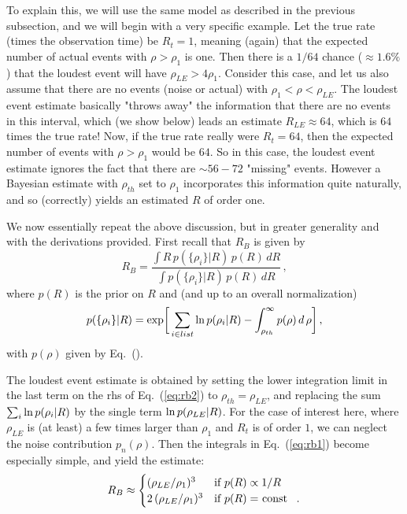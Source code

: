 \documentclass[aps,prd]{revtex4-1}
\newcommand{\be}{\begin{equation}}
\newcommand{\ee}{\end{equation}}
\begin{document}
To explain this, we will use the same model as described in the previous subsection, and we will begin with a very specific example.   Let the true rate (times the observation time) be $R_t = 1$, meaning (again) that the expected number of actual events with $\rho > \rho_1$ is one.   Then there is a $1/64$ chance ($\approx 1.6\%$) that the loudest event will have $\rho_{LE} > 4 \rho_1$.  Consider this case, and let us also assume that there are no events (noise or actual) with $\rho_1 < \rho < \rho_{LE}$.  The loudest event estimate basically "throws away" the information that there
are no events in this interval, which (we show below) leads an estimate $R_{LE} \approx 64$,
  which is $64$ times the true rate!  Now, if the true rate really were $R_t = 64$, then the expected number of 
events with $\rho > \rho_1$ would be $64$.  So in this case, the loudest event estimate 
ignores the fact that there are $\sim 56 -72$ "missing" events.  However a Bayesian estimate
with $\rho_{th}$ set to $\rho_1$ incorporates this information quite naturally, and so (correctly) yields an estimated $R$ of order one.

We now essentially repeat the above discussion, but in greater generality and with the derivations provided.   First recall that $R_B$ is given by
\be\label{eq:rb1}
R_B = \frac{  \int{ R\, p(\{\rho_i\}|R)  \, p(R)\, dR}}{  \int{ p(\{\rho_i\}|R)\, p(R)\, dR }}\, ,
\ee
\noindent
where $p(R)$ is the prior on $R$ and (and up to an overall normalization)
\be\label{eq:rb2}
p(\{\rho_i\}|R) = {\rm exp}\bigg[\sum_{i \in  list} {\rm ln}\, p(\rho_i|R) - \int_{\rho_{th}}^{\infty} p(\rho)\, d\,\rho  \bigg] \,  ,
\ee
\noindent
with $p(\rho)$ given by Eq.~().

The loudest event estimate is obtained by setting the lower integration limit in the last term on the rhs of Eq.~(\ref{eq:rb2}) to $\rho_{th} = \rho_{LE}$, and replacing the sum 
$\sum_i {\rm ln}\, p(\rho_i|R)$ by the single term ${\rm ln}\, p(\rho_{LE}|R)$.   For the case of interest here, where $\rho_{LE}$ is (at least) a few times larger than $\rho_1$ and $R_t$ is of order $1$, we can neglect the noise contribution $p_n(\rho)$. Then the integrals in Eq.~(\ref{eq:rb1}) become especially simple, and yield the estimate:
\be\label{eq:rb3}
R_B \approx 
\begin{cases}
(\rho_{LE}/\rho_1)^3 & \text{if $p(R) \propto 1/R$} \\
2\, (\rho_{LE}/\rho_1)^3 & \text{if $p(R) =$ const \, .} 
\end{cases}
\ee
\end{document}
